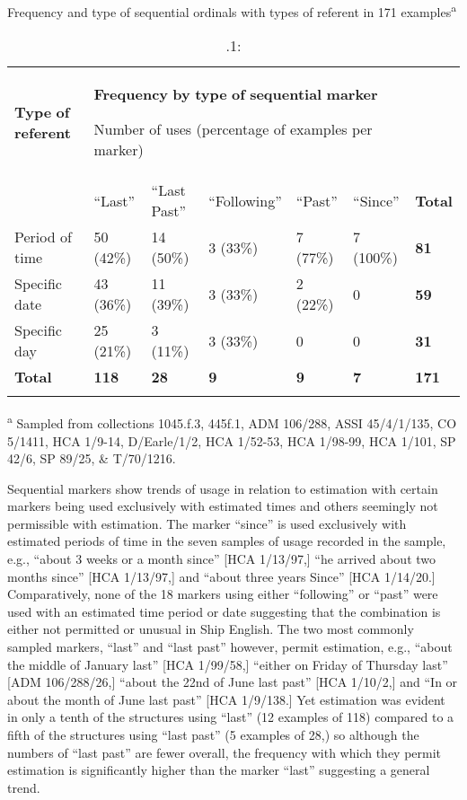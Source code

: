 \begin{table}
\caption{\label{tab:key:5}.1:} Frequency and type of sequential ordinals with types of referent in 171 examples\textsuperscript{a}

\begin{tabularx}{\textwidth}{XXXXXXX}
\lsptoprule
\textbf{Type} \textbf{of} \textbf{referent} & \multicolumn{5}{X}{\textbf{Frequency} \textbf{by} \textbf{type} \textbf{of} \textbf{sequential} \textbf{marker}

Number of uses (percentage of examples per marker)} & \\
& “Last” & “Last Past” & “Following” & “Past” & “Since” & \textbf{Total}\\
Period of time & 50 (42\%) & 14 (50\%) & 3 (33\%) & 7 (77\%) & 7 (100\%) & \textbf{81}\\
Specific date & 43 (36\%) & 11 (39\%) & 3 (33\%) & 2 (22\%) & 0 & \textbf{59}\\
Specific day & 25 (21\%) & 3 (11\%) & 3 (33\%) & 0 & 0 & \textbf{31}\\
 \textbf{Total} & \textbf{118}    &  \textbf{28} &     \textbf{9} &  \textbf{9} &  \textbf{7} & \textbf{171}\\
\lspbottomrule
\end{tabularx}
\end{table}
\textsuperscript{a} Sampled from collections 1045.f.3, 445f.1, ADM 106/288, ASSI 45/4/1/135, CO 5/1411, HCA 1/9-14, D/Earle/1/2, HCA 1/52-53, HCA 1/98-99, HCA 1/101, SP 42/6, SP 89/25, \& T/70/1216.

  Sequential markers show trends of usage in relation to estimation with certain markers being used exclusively with estimated times and others seemingly not permissible with estimation. The marker “since” is used exclusively with estimated periods of time in the seven samples of usage recorded in the sample, e.g., “about 3 weeks or a month since” [HCA 1/13/97,] “he arrived about two months since” [HCA 1/13/97,] and “about three years Since” [HCA 1/14/20.] Comparatively, none of the 18 markers using either “following” or “past” were used with an estimated time period or date suggesting that the combination is either not permitted or unusual in Ship English. The two most commonly sampled markers, “last” and “last past” however, permit estimation, e.g., “about the middle of January last” [HCA 1/99/58,] “either on Friday of Thursday last” [ADM 106/288/26,] “about the 22nd of June last past” [HCA 1/10/2,] and “In or about the month of June last past” [HCA 1/9/138.] Yet estimation was evident in only a tenth of the structures using “last” (12 examples of 118) compared to a fifth of the structures using “last past” (5 examples of 28,) so although the numbers of “last past” are fewer overall, the frequency with which they permit estimation is significantly higher than the marker “last” suggesting a general trend. 

